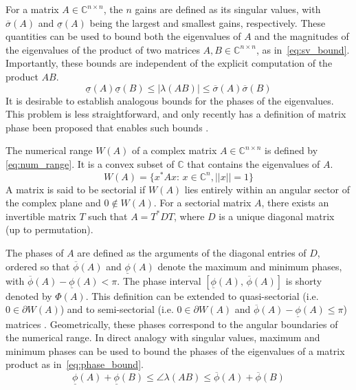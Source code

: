 For a matrix $A\in \mathbb{C}^{n\times n}$, the $n$ gains are defined as its singular values, with $\overline{\sigma}(A)$ and $\underline{\sigma}(A)$ being the largest and smallest gains, respectively. These quantities can be used to bound both the eigenvalues of $A$ and the magnitudes of the eigenvalues of the product of two matrices $A,B\in\mathbb{C}^{n\times n}$, as in~\eqref{eq:sv_bound}. Importantly, these bounds are independent of the explicit computation of the product $AB$.
\begin{equation}
    \underline{\sigma}(A)\underline{\sigma}(B) \leq |\lambda(AB)| \leq \overline{\sigma}(A)\overline{\sigma}(B) 
    \label{eq:sv_bound}
\end{equation}
It is desirable to establish analogous bounds for the phases of the eigenvalues. This problem is less straightforward, and only recently has a definition of matrix phase been proposed that enables such bounds \cite{wangPhasesComplexMatrix2020, chenPhaseAnalysisIEEE}.

The numerical range $W(A)$ of a complex matrix $A\in \mathbb{C}^{n\times n}$ is defined by \eqref{eq:num_range}. It is a convex subset of $\mathbb{C}$ that contains the eigenvalues of $A$.
\begin{equation}
    W(A)=\{ x^*Ax:\,x\in\mathbb{C}^n, ||x||=1\}
    \label{eq:num_range}
\end{equation}
A matrix is said to be sectorial if $W(A)$ lies entirely within an angular sector of the complex plane and $0 \notin W(A)$. For a sectorial matrix $A$, there exists an invertible matrix $T$ such that $A=T^*DT$, where $D$ is a unique diagonal matrix (up to permutation). 

The phases of $A$ are defined as the arguments of the diagonal entries of $D$, ordered so that $\overline{\phi}(A)$ and $\underline{\phi}(A)$ denote the maximum and minimum phases, with $\overline{\phi}(A)-\underline{\phi}(A) < \pi$. The phase interval $[\underline{\phi}(A),\, \overline{\phi}(A)]$ is shorty denoted by $\Phi(A)$. This definition can be extended to quasi-sectorial (i.e. $0 \in \partial W(A)$) and to semi-sectorial (i.e. $0 \in \partial W(A)$ and $\overline{\phi}(A)-\underline{\phi}(A) \leq \pi$) matrices \cite{chenPhaseTheoryMIMO2022}.
Geometrically, these phases correspond to the angular boundaries of the numerical range. In direct analogy with singular values, maximum and minimum phases can be used to bound the phases of the eigenvalues of a matrix product as in~\eqref{eq:phase_bound}.
\begin{equation}
    \underline{\phi}(A)+\underline{\phi}(B) \leq \angle{\lambda(AB)} \leq \overline{\phi}(A)+\overline{\phi}(B) 
    \label{eq:phase_bound}
\end{equation}